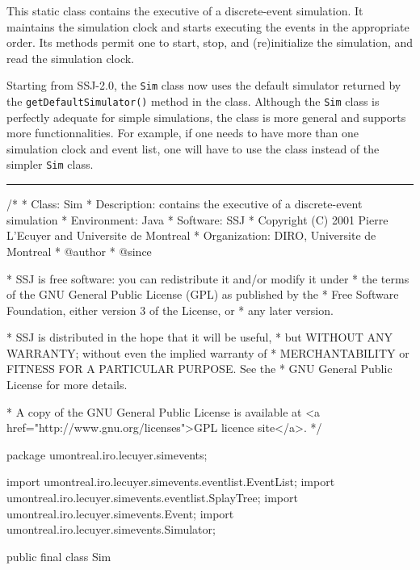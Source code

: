 
This static class contains the executive of a discrete-event simulation.
It maintains the simulation clock and starts executing the events
in the appropriate order.
Its methods permit one to start, stop, and (re)initialize the simulation,
and read the simulation clock.

Starting from SSJ-2.0, the \texttt{Sim} class now uses
the default simulator returned by the \texttt{getDefaultSimulator()}
method in the  class. Although the \texttt{Sim} class is
perfectly adequate for simple simulations, the  class
is more general and supports more functionnalities.
For example, if one needs to have more than one simulation clock and event list,
one will have to use the  class instead of the simpler
\texttt{Sim} class.

\bigskip\hrule

\begin{code}
\begin{hide}
/*
 * Class:        Sim
 * Description:  contains the executive of a discrete-event simulation
 * Environment:  Java
 * Software:     SSJ
 * Copyright (C) 2001  Pierre L'Ecuyer and Universite de Montreal
 * Organization: DIRO, Universite de Montreal
 * @author
 * @since

 * SSJ is free software: you can redistribute it and/or modify it under
 * the terms of the GNU General Public License (GPL) as published by the
 * Free Software Foundation, either version 3 of the License, or
 * any later version.

 * SSJ is distributed in the hope that it will be useful,
 * but WITHOUT ANY WARRANTY; without even the implied warranty of
 * MERCHANTABILITY or FITNESS FOR A PARTICULAR PURPOSE.  See the
 * GNU General Public License for more details.

 * A copy of the GNU General Public License is available at
   <a href="http://www.gnu.org/licenses">GPL licence site</a>.
 */
\end{hide}
package umontreal.iro.lecuyer.simevents;\begin{hide}
import umontreal.iro.lecuyer.simevents.eventlist.EventList;
import umontreal.iro.lecuyer.simevents.eventlist.SplayTree;
import umontreal.iro.lecuyer.simevents.Event;
import umontreal.iro.lecuyer.simevents.Simulator;\end{hide}

public final class Sim \begin{hide} {

   // Prevents construction of this object
   private Sim() {}
\end{hide}
\end{code}
